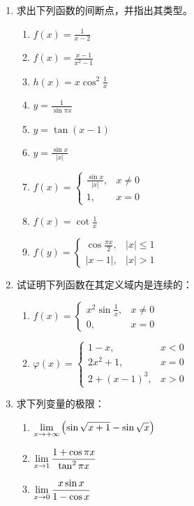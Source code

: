\begin{ex}
\begin{enumerate}
\item 求出下列函数的间断点，并指出其类型。
\begin{multicols}{2}
\begin{enumerate}
    \item $f(x)=\frac{1}{x-2}$
    \item $f(x)=\frac{x-1}{x^2-1}$
    \item $h(x)=x\cos^2 \frac{1}{x}$
    \item $y=\frac{1}{\sin\pi x}$
    \item $y=\tan(x-1)$
    \item $y=\frac{\sin x}{|x|}$
    \item $f(x)=\begin{cases}
        \frac{\sin x}{|x|},&x\ne 0\\
        1,& x=0
    \end{cases}$
    \item $f(x)=\cot\frac{1}{x}$
    \item $f(y)=\begin{cases}
        \cos\frac{\pi x}{2},& |x|\le 1\\
        |x-1|,& |x|>1
    \end{cases}$
\end{enumerate}
\end{multicols}
\item 试证明下列函数在其定义域内是连续的：
\begin{enumerate}
    \item $f(x)=\begin{cases}
        x^2\sin\frac{1}{x},&x\ne 0\\
        0,&x=0
    \end{cases}$
    \item $\varphi(x)=\begin{cases}
        1-x,& x<0\\
        2x^2+1,& x=0\\
        2+(x-1)^3,& x>0
    \end{cases}$
\end{enumerate}
\item 求下列变量的极限：
\begin{multicols}{2}
    \begin{enumerate}
\item $\displaystyle\lim_{x\to+\infty}\left(\sin\sqrt{x+1}-\sin\sqrt{x}\right)$
\item $\displaystyle\lim_{x\to 1}\dfrac{1+\cos\pi x}{\tan^2 \pi x}$
\item $\displaystyle\lim_{x\to 0}\dfrac{x\sin x}{1-\cos x}$

\end{enumerate}
\end{multicols}
\end{enumerate}
\end{ex}
